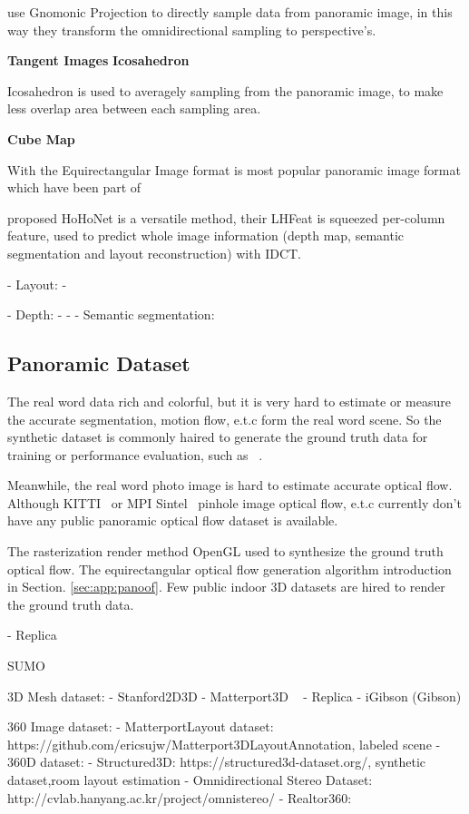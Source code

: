 \cite{coors2018spherenet} use Gnomonic Projection to directly sample data from panoramic image, in this way they transform the omnidirectional sampling to perspective's.

\textbf{Tangent Images}
\textbf{Icosahedron}

Icosahedron is used to averagely sampling from the panoramic image, to make less overlap area between each sampling area.

\cite{eder2019mapped}




\textbf{Cube Map}

With the
Equirectangular Image format is most popular panoramic image format which have been part of 


\cite{sun2020hohonet} proposed HoHoNet is a versatile method, their LHFeat is squeezed per-column feature, used to predict whole image information (depth map, semantic segmentation and layout reconstruction) with IDCT. 

- Layout:
- \cite{xxxx}

- Depth:
- \cite{wang2020bifuse} 
- 
- Semantic segmentation:


\subsection{Panoramic Dataset}


The real word data rich and colorful, but it is very hard to estimate or measure the accurate segmentation, motion flow, e.t.c form the real word scene.
So the synthetic dataset is commonly haired to generate the ground truth data for training or performance evaluation, such as ~\cite{habitat19iccv}.

Meanwhile, the real word photo image is hard to estimate accurate optical flow.
Although KITTI~\cite{Menze2018JPRS} or MPI Sintel~\cite{Butler:ECCV:2012} pinhole image optical flow, e.t.c currently don't have any public panoramic optical flow dataset is available.

The rasterization render method OpenGL used to synthesize the ground truth optical flow.
The equirectangular optical flow generation algorithm introduction in Section. \ref{sec:app:panoof}.
Few public indoor 3D datasets are hired to render the ground truth data.

- Replica ~\cite{replica19arxiv}

SUMO


3D Mesh dataset:
- Stanford2D3D \cite{armeni2017joint}
- Matterport3D ~\cite{Matterport3D}
- Replica
- iGibson (Gibson)


360 Image dataset:
- MatterportLayout dataset: https://github.com/ericsujw/Matterport3DLayoutAnnotation, labeled scene
- 360D dataset:
- Structured3D: https://structured3d-dataset.org/, synthetic dataset,room layout estimation
- Omnidirectional Stereo Dataset: http://cvlab.hanyang.ac.kr/project/omnistereo/
- Realtor360: 

